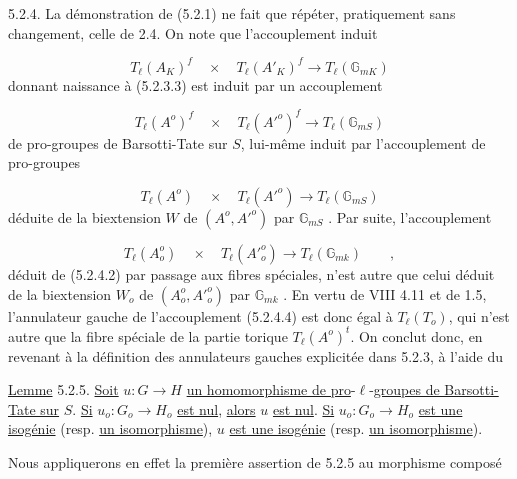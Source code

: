 5.2.4.  La démonstration de (5.2.1) ne fait que répéter, pratiquement sans changement, celle de 2.4. On note que l'accouplement induit

\begin{equation}\tag{5.2.4.1}
T_\ell(A_K)^f \quad \times \quad T_\ell(A'_K)^f \longrightarrow T_\ell(\mathbb{G}_{mK})
\end{equation}
donnant naissance à (5.2.3.3) est induit par un accouplement

\begin{equation}\tag{5.2.4.2}
T_\ell(A^o)^f \quad \times \quad T_\ell({A'}^o)^f \longrightarrow T_\ell(\mathbb{G}_{mS})
\end{equation}
de pro-groupes de Barsotti-Tate sur $S$, lui-même induit par l'accouplement de pro-groupes

\begin{equation}\tag{5.2.4.3}
T_\ell(A^o) \quad \times \quad T_\ell({A'}^o) \longrightarrow T_\ell(\mathbb{G}_{mS})
\end{equation}
déduite de la biextension $W$ de $(A^o,{A'}^o)$ par $\mathbb{G}_{mS}$ . Par suite, l'accouplement

\begin{equation}\tag{5.2.4.4}
T_\ell(A_o^{o}) \quad \times \quad T_\ell({A'}_o^{o}) \longrightarrow T_\ell(\mathbb{G}_{mk}) \qquad ,
\end{equation}
déduit de (5.2.4.2) par passage aux fibres spéciales, n'est autre que celui déduit de la biextension $W_o$ de $(A_o^{o},{A'}_o^{o})$ par $\mathbb{G}_{mk}$ . En vertu de VIII 4.11 et de 1.5, l'annulateur gauche de l'accouplement (5.2.4.4) est donc égal à $T_\ell(T_o)$, qui n'est autre que la fibre spéciale de la partie torique $T_\ell(A^o)^t$. On conclut donc, en revenant à la définition des annulateurs gauches explicitée dans 5.2.3, à l'aide du



\underline{Lemme} 5.2.5. \underline{Soit} $u : G \longrightarrow H$ \underline{un homomorphisme de pro}-$\ell$-\underline{groupes de Barsotti-Tate sur} $S$. \underline{Si} $u_o : G_o \longrightarrow H_o$ \underline{est nul}, \underline{alors} $u$ \underline{est nul}. \underline{Si} $u_o : G_o \longrightarrow H_o$ \underline{est une isogénie} (resp. \underline{un isomorphisme}), $u$ \underline{est une isogénie} (resp. \underline{un isomorphisme}).

Nous appliquerons en effet la première assertion de 5.2.5 au morphisme composé

